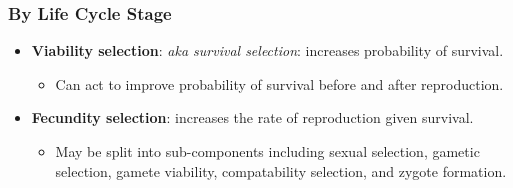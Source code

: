 \documentclass[12pt,a4paper]{article}
\begin{document}
\begin{itemize}
    \subsubsection{By Life Cycle Stage}
    \begin{itemize}
        \item \textbf{Viability selection}: \textit{aka survival selection}: increases probability of survival. 
            \begin{itemize}
                \item Can act to improve probability of survival before and after reproduction.
            \end{itemize}
        \item \textbf{Fecundity selection}: increases the rate of reproduction given survival.
            \begin{itemize}
                \item May be split into sub-components including sexual selection, gametic selection, gamete viability, compatability selection, and zygote formation.
            \end{itemize}
    \end{itemize}
\end{itemize}
\end{document}
